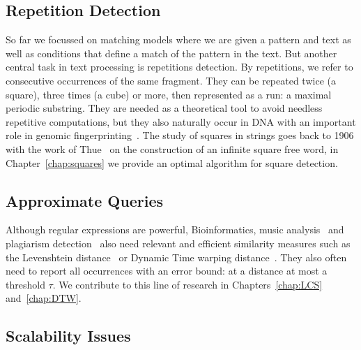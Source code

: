 \subsection{Repetition Detection}
So far we focussed on matching models where we are given a pattern and text as well as conditions that define a match of the pattern in the text. But another central task in text processing is repetitions detection. By repetitions, we refer to consecutive occurrences of the same fragment. They can be repeated twice (a square), three times (a cube) or more, then represented as a run: a maximal periodic substring. They are needed as a theoretical tool to avoid needless repetitive computations, but they also naturally occur in DNA with an important role in genomic fingerprinting~\cite{Kolpakov2003}.
The study of squares in strings goes back to 1906 with the work of Thue~\cite{thue1906} on the construction of an infinite square free word, in Chapter~\ref{chap:squares} we provide an optimal algorithm for square detection.


\subsection{Approximate Queries}
Although regular expressions are powerful, Bioinformatics\cite{Gusfield1997}, music analysis~\cite{mongeau1990comparison} and plagiarism detection~\cite{lukashenko2007computer} also need relevant and efficient similarity measures such as the Levenshtein distance~\cite{levenshtein1966binary} or Dynamic Time warping distance~\cite{sakoe1978dynamic}. They also often need to report all occurrences with an error bound\cite{landau1986efficient,landau1989fast}: at a distance at most a threshold $\tau$.
We contribute to this line of research in Chapters~\ref{chap:LCS} and~\ref{chap:DTW}.


\subsection{Scalability Issues}\label{sec:intro:scalability}

 
